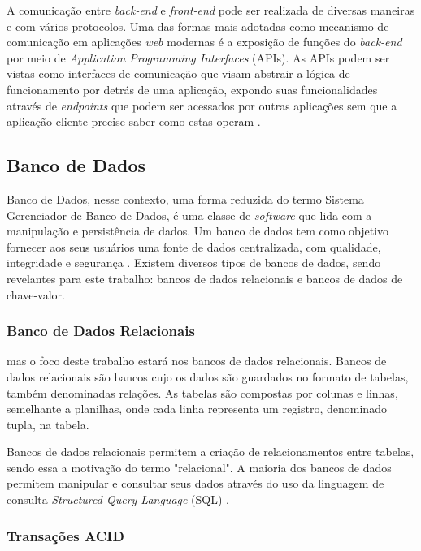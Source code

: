 A comunicação entre \textit{back-end} e \textit{front-end} pode ser realizada de diversas maneiras e com vários protocolos. Uma das formas mais adotadas como mecanismo de comunicação em aplicações \textit{web} modernas é a exposição de funções do \textit{back-end} por meio de \textit{Application Programming Interfaces} (APIs). As APIs podem ser vistas como interfaces de comunicação que visam abstrair a lógica de funcionamento por detrás de uma aplicação, expondo suas funcionalidades através de \textit{endpoints} que podem ser acessados por outras aplicações sem que a aplicação cliente precise saber como estas operam \cite{gough2021mastering}. 

\subsection{Banco de Dados}

Banco de Dados, nesse contexto, uma forma reduzida do termo Sistema Gerenciador de Banco de Dados, é uma classe de \textit{software} que lida com a manipulação e persistência de dados. Um banco de dados tem como objetivo fornecer aos seus usuários uma fonte de dados centralizada, com qualidade, integridade e segurança \cite{fry1976evolution}. Existem diversos tipos de bancos de dados, sendo revelantes para este trabalho: bancos de dados relacionais e bancos de dados de chave-valor.

\subsubsection{Banco de Dados Relacionais}

 mas o foco deste trabalho estará nos bancos de dados relacionais. Bancos de dados relacionais são bancos cujo os dados são guardados no formato de tabelas, também denominadas relações. As tabelas são compostas por colunas e linhas, semelhante a planilhas, onde cada linha representa um registro, denominado tupla, na tabela.

Bancos de dados relacionais permitem a criação de relacionamentos entre tabelas, sendo essa a motivação do termo "relacional". A maioria dos bancos de dados permitem manipular e consultar seus dados através do uso da linguagem de consulta \textit{Structured Query Language} (SQL) \cite{jatana2012survey}.

\subsubsection{Transações ACID}

